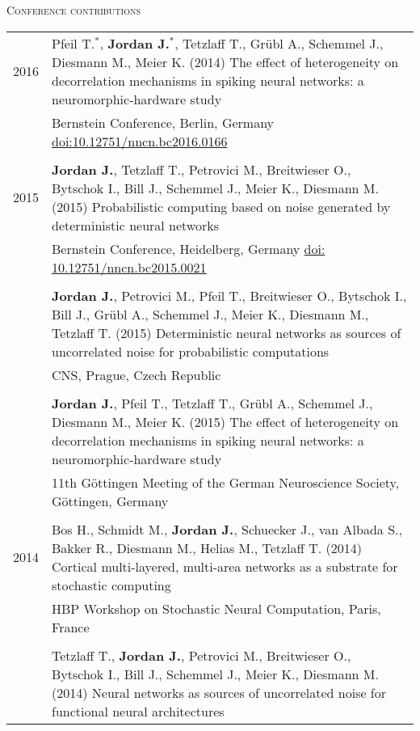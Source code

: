 \textsc{Conference contributions}\\[1em]
\begin{tabular}{>{\hfill}p{1.6cm} p{}}
  2016 & Pfeil T.$^*$, \textbf{Jordan J.}$^*$, Tetzlaff T., Gr\"ubl A., Schemmel J., Diesmann M., Meier K. (2014) The effect of heterogeneity on decorrelation mechanisms in spiking neural networks: a neuromorphic-hardware study \\
  & \footnotesize Bernstein Conference, Berlin, Germany \href{http://dx.doi.org/10.12751/nncn.bc2016.0166}{doi:10.12751/nncn.bc2016.0166}\\
  \multicolumn{2}{c}{} \\
  2015 & \textbf{Jordan J.}, Tetzlaff T., Petrovici M., Breitwieser O., Bytschok I., Bill J., Schemmel J., Meier K., Diesmann M. (2015) Probabilistic computing based on noise generated by deterministic neural networks\\
  & \footnotesize Bernstein Conference, Heidelberg, Germany \href{http://dx.doi.org/10.12751/nncn.bc2015.0021}{doi: 10.12751/nncn.bc2015.0021}\\
 \multicolumn{2}{c}{} \\
  & \textbf{Jordan J.}, Petrovici M., Pfeil T., Breitwieser O., Bytschok I., Bill J., Gr\"ubl A., Schemmel J., Meier K., Diesmann M., Tetzlaff T. (2015) Deterministic neural networks as sources of uncorrelated noise for probabilistic computations\\
  & \footnotesize CNS, Prague, Czech Republic\\
 \multicolumn{2}{c}{} \\
  & \textbf{Jordan J.}, Pfeil T., Tetzlaff T., Gr\"ubl A., Schemmel J., Diesmann M., Meier K. (2015) The effect of heterogeneity on decorrelation mechanisms in spiking neural networks: a neuromorphic-hardware study \\
  & \footnotesize 11th G\"ottingen Meeting of the German Neuroscience Society, G\"ottingen, Germany \\
  \multicolumn{2}{c}{} \\
  2014 & Bos H., Schmidt M., \textbf{Jordan J.}, Schuecker J., van Albada S., Bakker R., Diesmann M., Helias M., Tetzlaff T. (2014) Cortical multi-layered, multi-area networks as a substrate for stochastic computing \\
  & \footnotesize HBP Workshop on Stochastic Neural Computation, Paris, France \\
  \multicolumn{2}{c}{} \\
  &  Tetzlaff T., \textbf{Jordan J.}, Petrovici M., Breitwieser O., Bytschok I., Bill J., Schemmel J., Meier K., Diesmann M. (2014) Neural networks as sources of uncorrelated noise for functional neural architectures \\

\end{tabular}
